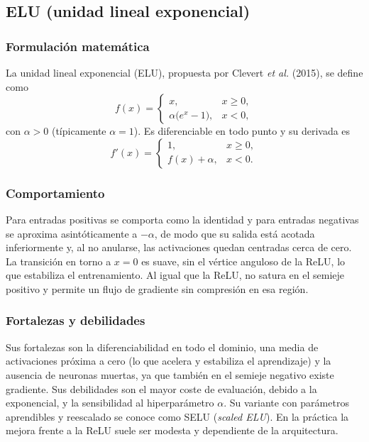 \documentclass[12pt,a4paper]{article}
\begin{document}
\subsection{ELU (unidad lineal exponencial)}

\subsubsection{Formulación matemática}
La unidad lineal exponencial (ELU), propuesta por Clevert \emph{et al.} (2015), se define como
\begin{equation*}
f(x) =
\begin{cases}
x, & x \geq 0,\\
\alpha \bigl(e^{x} - 1\bigr), & x < 0,
\end{cases}
\end{equation*}
con $\alpha > 0$ (típicamente $\alpha = 1$). Es diferenciable en todo punto y su derivada es
\begin{equation*}
f'(x) =
\begin{cases}
1, & x \geq 0,\\
f(x) + \alpha, & x < 0.
\end{cases}
\end{equation*}

\subsubsection{Comportamiento}
Para entradas positivas se comporta como la identidad y para entradas negativas se aproxima asintóticamente a $-\alpha$, de modo que su salida está acotada inferiormente y, al no anularse, las activaciones quedan centradas cerca de cero. La transición en torno a $x = 0$ es suave, sin el vértice anguloso de la ReLU, lo que estabiliza el entrenamiento. Al igual que la ReLU, no satura en el semieje positivo y permite un flujo de gradiente sin compresión en esa región.

\subsubsection{Fortalezas y debilidades}
Sus fortalezas son la diferenciabilidad en todo el dominio, una media de activaciones próxima a cero (lo que acelera y estabiliza el aprendizaje) y la ausencia de neuronas muertas, ya que también en el semieje negativo existe gradiente. Sus debilidades son el mayor coste de evaluación, debido a la exponencial, y la sensibilidad al hiperparámetro $\alpha$. Su variante con parámetros aprendibles y reescalado se conoce como SELU (\emph{scaled ELU}). En la práctica la mejora frente a la ReLU suele ser modesta y dependiente de la arquitectura.
\end{document}
